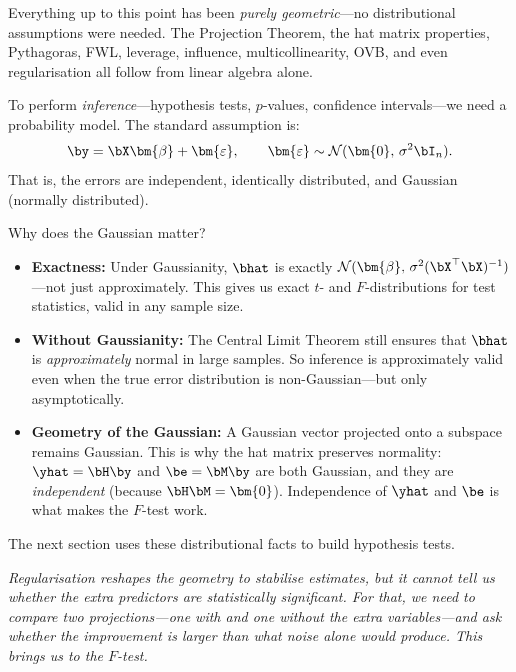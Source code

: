 
\medskip
\begin{remark}
Everything up to this point has been \emph{purely geometric}---no
distributional assumptions were needed.
The Projection Theorem, the hat matrix properties, Pythagoras, FWL,
leverage, influence, multicollinearity, OVB, and even regularisation
all follow from linear algebra alone.

To perform \emph{inference}---hypothesis tests, $p$-values, confidence
intervals---we need a probability model.
The standard assumption is:
\[
  \by = \bX\bm{\beta} + \bm{\varepsilon},
  \qquad
  \bm{\varepsilon} \sim \mathcal{N}(\bm{0},\, \sigma^2 \bI_n).
\]
That is, the errors are independent, identically distributed, and
Gaussian (normally distributed).

Why does the Gaussian matter?
\begin{itemize}[nosep]
  \item \textbf{Exactness:} Under Gaussianity, $\bhat$ is exactly
        $\mathcal{N}(\bm{\beta},\, \sigma^2(\bX^\top\bX)^{-1})$---not
        just approximately. This gives us exact $t$- and $F$-distributions
        for test statistics, valid in any sample size.
  \item \textbf{Without Gaussianity:} The Central Limit Theorem still
        ensures that $\bhat$ is \emph{approximately} normal in large samples.
        So inference is approximately valid even when the true error
        distribution is non-Gaussian---but only asymptotically.
  \item \textbf{Geometry of the Gaussian:} A Gaussian vector projected
        onto a subspace remains Gaussian. This is why the hat matrix
        preserves normality: $\yhat = \bH\by$ and
        $\be = \bM\by$ are both Gaussian, and they are
        \emph{independent} (because $\bH\bM = \bm{0}$).
        Independence of $\yhat$ and $\be$ is what makes the $F$-test work.
\end{itemize}
The next section uses these distributional facts to build hypothesis tests.
\end{remark}

\medskip
\noindent\textit{Regularisation reshapes the geometry to stabilise
estimates, but it cannot tell us whether the extra predictors are
\emph{statistically significant}.
For that, we need to compare two projections---one with and one
without the extra variables---and ask whether the improvement is
larger than what noise alone would produce.
This brings us to the $F$-test.}


